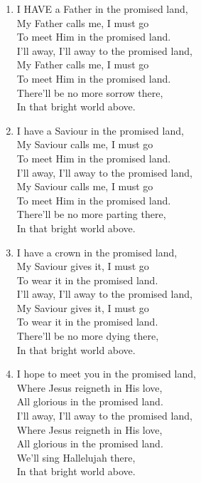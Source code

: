 \documentclass[11pt,a4paper]{article}
\begin{document}
\begin{enumerate}
    \item I HAVE a Father in the promised land, \\
        My Father calls me, I must go \\
        To meet Him in the promised land. \\
        I'll away, I'll away to the promised land, \\
        My Father calls me, I must go \\
        To meet Him in the promised land. \\
        There'll be no more sorrow there, \\
        In that bright world above.

    \item I have a Saviour in the promised land, \\
        My Saviour calls me, I must go \\
        To meet Him in the promised land. \\
        I'll away, I'll away to the promised land, \\
        My Saviour calls me, I must go \\
        To meet Him in the promised land. \\
        There'll be no more parting there, \\
        In that bright world above.

    \item I have a crown in the promised land, \\
        My Saviour gives it, I must go \\
        To wear it in the promised land. \\
        I'll away, I'll away to the promised land, \\
        My Saviour gives it, I must go \\
        To wear it in the promised land. \\
        There'll be no more dying there, \\
        In that bright world above.

    \item I hope to meet you in the promised land, \\
        Where Jesus reigneth in His love, \\
        All glorious in the promised land. \\
        I'll away, I'll away to the promised land, \\
        Where Jesus reigneth in His love, \\
        All glorious in the promised land. \\
        We'll sing Hallelujah there, \\
        In that bright world above.

\end{enumerate}
\end{document}
